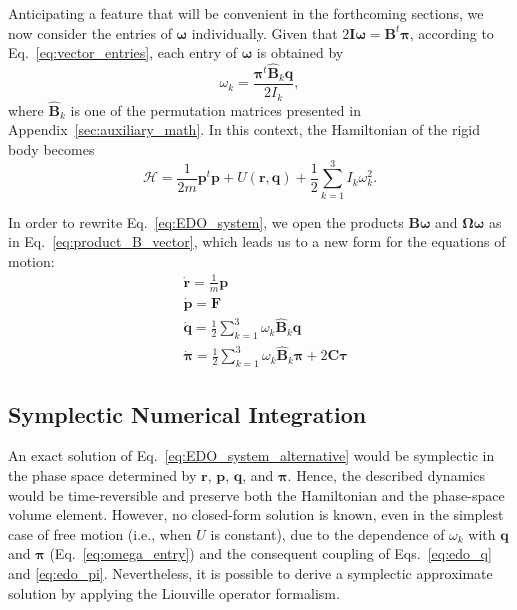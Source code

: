 \documentclass[aip,jcp,reprint,amsmath,amssymb,raggedbottom]{revtex4-1}
\newcommand{\mt}[1]{\boldsymbol{\mathbf{#1}}}           %
\newcommand{\vt}[1]{\boldsymbol{\mathbf{#1}}}           %
\newcommand{\tr}[1]{#1^t}                               %
\begin{document}
Anticipating a feature that will be convenient in the forthcoming sections, we now consider the entries of $\vt \omega$ individually. Given that $2{\mt I}{\vt \omega} = \tr{\mt B}{\vt \pi}$, according to Eq.~\ref{eq:vector_entries}, each entry of $\vt \omega$ is obtained by
\begin{equation}
\label{eq:omega_entry}
\omega_k = \frac{\tr{\vt \pi} \hat{\mt B}_k \vt q}{2 I_k},
\end{equation}
where $\hat{\mt B}_k$ is one of the permutation matrices presented in Appendix~\ref{sec:auxiliary_math}. In this context, the Hamiltonian of the rigid body becomes
\[
\mathcal{H} = \frac{1}{2m} \tr{\vt p} \vt p + U(\vt r, \vt q) + \frac{1}{2} \sum_{k=1}^3 I_k \omega_k^2.
\]

In order to rewrite Eq.~\ref{eq:EDO_system}, we open the products $\mt B \vt \omega$ and $\mt \Omega \vt \omega$ as in Eq.~\ref{eq:product_B_vector}, which leads us to a new form for the equations of motion:
\begin{subequations}
\label{eq:EDO_system_alternative}
\begin{align}
&\dot{\vt r} = \frac{1}{m} \vt p \\
&\dot{\vt p} = \vt F \\
&\dot{\vt q} = \frac{1}{2} \sum_{k=1}^3 \omega_k \hat{\mt B}_k \vt q \label{eq:edo_q} \\
&\dot{\vt \pi} = \frac{1}{2} \sum_{k=1}^3 \omega_k \hat{\mt B}_k \vt \pi + 2 \mt C \vt \tau \label{eq:edo_pi}
\end{align}
\end{subequations}

\subsection{Symplectic Numerical Integration}  
\label{sec:symplectic}

An exact solution of Eq.~\ref{eq:EDO_system_alternative} would be symplectic in the phase space determined by $\vt r$, $\vt p$, $\vt q$, and $\vt \pi$. Hence, the described dynamics would be time-reversible and preserve both the Hamiltonian and the phase-space volume element. However, no closed-form solution is known, even in the simplest case of free motion (i.e., when $U$ is constant), due to the dependence of $\omega_k$ with $\vt q$ and $\vt \pi$ (Eq.~\ref{eq:omega_entry}) and the consequent coupling of Eqs.~\ref{eq:edo_q} and \ref{eq:edo_pi}. Nevertheless, it is possible to derive a symplectic approximate solution by applying the Liouville operator formalism.\cite{Tuckerman2010}
\end{document}
